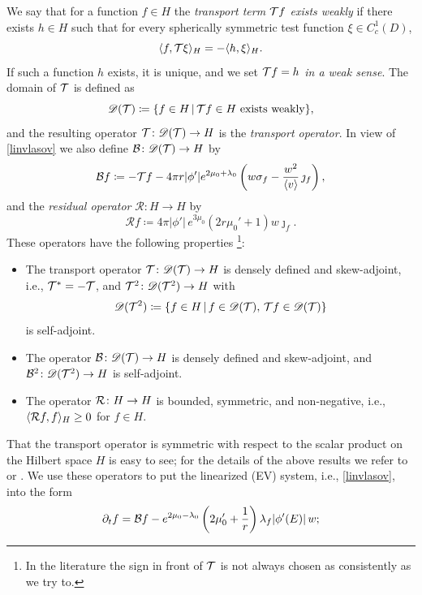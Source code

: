 \documentclass[11pt]{article}
\begin{document}
We say that for a function $f\in H$ the {\em transport term} ${\cal T} f$
{\em exists weakly} if there exists $h \in H$ such that for every
spherically symmetric test function $\xi \in C^1_{c}(D)$,
\[ 
\langle f, {\cal T} \xi \rangle_H = - \langle h, \xi \rangle_H. 
\]
If such a function $h$ exists, it is unique, and
we set {\em ${\cal T} f = h $ in a weak sense}.
The domain of ${\cal T}$ is defined as 
\[ 
{\mathscr D}({\cal T}) \coloneqq \{f \in H \, | \, {\cal T} f \in H \text{ exists weakly}\},
\]
and the resulting operator ${\cal T}\colon \mathrm {{\mathscr D}}({\cal T})\to H$ is the
{\em transport operator}. In view of \eqref{linvlasov} we also define
${\cal B}\colon  {\mathscr D}({\cal T}) \to H$ by
\begin{equation}\label{Bdef} 
  {\cal B} f \coloneqq - {\cal T} f - 4\pi r |\phi'| e^{2\mu_0+\lambda_0}
  \left (w \sigma_f - \frac{w^2}{\left\langle v\right\rangle}\,\jmath_f \right ),
\end{equation}
and the {\em residual operator} $\mathcal{R}\colon H \to H$ by 
\[ 
\mathcal{R}f \coloneqq 4\pi |\phi'|\,e^{3\mu_0} (2r\mu_0'+1) w \jmath_f.
\]
These operators have the following properties
\footnote{In the literature the sign in front of ${\cal T}$ is not always chosen
          as consistently as we try to.}:
%
%
\begin{lemma}\label{oplemma1}
  \begin{itemize}
  \item[(a)]
    The transport operator ${\cal T} \colon {\mathscr D}({\cal T}) \to H$ is densely defined
    and skew-adjoint, i.e.,
    ${\cal T}^\ast=-{\cal T}$, and ${\cal T}^2 \colon \mathrm {{\mathscr D}}({\cal T}^2) \to H$
    with
    \[
    {\mathscr D}({\cal T}^2) \coloneqq \left\{f \in H \, |\, f \in {\mathscr D}({\cal T}), \,
    {\cal T} f \in {\mathscr D}({\cal T}) \right\}
    \]
    is self-adjoint.
  \item[(b)]
    The operator ${\cal B} \colon {\mathscr D}({\cal T}) \to H$ is densely defined and skew-adjoint,
    and ${\cal B}^2 \colon {\mathscr D}({\cal T}^2) \to H$ is self-adjoint.
  \item[(c)]
    The operator ${{\cal R}} \colon H \to H$ is bounded, symmetric,
    and non-negative, i.e., $ \langle {{\cal R}} f, f \rangle_H \geq 0$ for $f\in H$.
  \end{itemize}
\end{lemma}
%
%
That the transport operator is symmetric with respect to the scalar product
on the Hilbert space $H$ is easy to see; for the details of the above results
we refer to \cite{GueStrRe} or \cite{HaLinRe}. We use these operators to put
the linearized (EV) system, i.e., \eqref{linvlasov}, into the form
\begin{equation}\label{linev}
  \partial_t f = {\cal B} f 
  - e^{2\mu_0-\lambda_0} \left(2\mu_0'+\frac{1}{r}\right)
  \lambda_{f} |\phi'(E)|\, w;
\end{equation}
\end{document}
